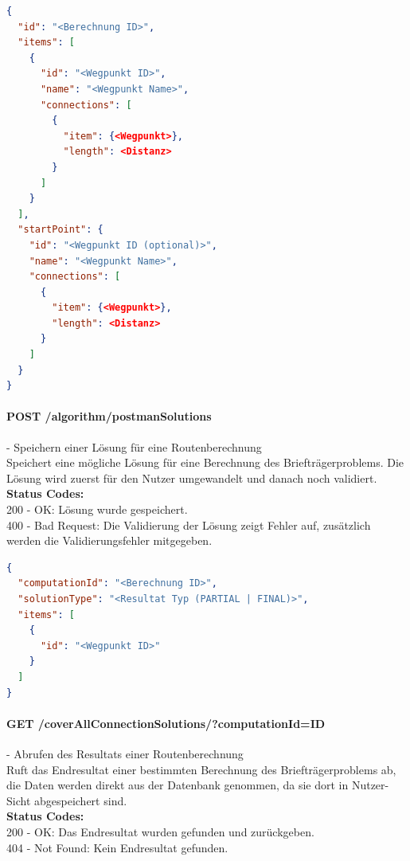 \begin{lstlisting}[language=JSON, caption=Beispiel für Eingabedaten des Briefträgerproblems für den Algorithmus, label=lst:input_postman_algo]  
{
  "id": "<Berechnung ID>",
  "items": [
    {
      "id": "<Wegpunkt ID>",
      "name": "<Wegpunkt Name>",
      "connections": [
        {
          "item": {<Wegpunkt>},
          "length": <Distanz>
        }
      ]
    }
  ],
  "startPoint": {
    "id": "<Wegpunkt ID (optional)>",
    "name": "<Wegpunkt Name>",
    "connections": [
      {
        "item": {<Wegpunkt>},
        "length": <Distanz>
      }
    ]
  }
}
\end{lstlisting}

\paragraph{POST /algorithm/postmanSolutions} - Speichern einer Lösung für eine Routenberechnung\mbox{}\\
Speichert eine mögliche Lösung für eine Berechnung des Briefträgerproblems. Die Lösung wird zuerst für den Nutzer umgewandelt und danach noch validiert.\\
\textbf{Status Codes:}\\
200 - OK: Lösung wurde gespeichert.\\
400 - Bad Request: Die Validierung der Lösung zeigt Fehler auf, zusätzlich werden die Validierungsfehler mitgegeben.\\

\begin{lstlisting}[language=JSON, caption=Beispiel eines Resultates für das Briefträgerproblem aus Algorithmus-Sicht, label=lst:solution_postman_algo]  
{
  "computationId": "<Berechnung ID>",
  "solutionType": "<Resultat Typ (PARTIAL | FINAL)>",
  "items": [
    {
      "id": "<Wegpunkt ID>"
    }
  ]
}
\end{lstlisting}

\paragraph{GET /coverAllConnectionSolutions/?computationId={ID}} - Abrufen des Resultats einer Routenberechnung\mbox{}\\
Ruft das Endresultat einer bestimmten Berechnung des Briefträgerproblems ab, die Daten werden direkt aus der Datenbank genommen, da sie dort in Nutzer-Sicht abgespeichert sind.\\
\textbf{Status Codes:}\\
200 - OK: Das Endresultat wurden gefunden und zurückgeben.\\
404 - Not Found: Kein Endresultat gefunden.\\

